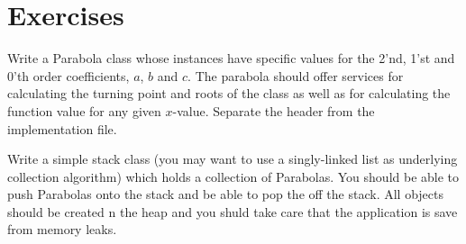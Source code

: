 \section{Exercises}

\begin{exercises}
  \item Write a Parabola class whose instances have specific values for 
        the 2'nd, 1'st and 0'th order coefficients, $a$, $b$ and $c$.
        The parabola should offer services for calculating the turning
        point and roots of the class as well as for calculating the function
        value for any given $x$-value. Separate the header from the
        implementation file.
        
  \item Write a simple stack class (you may want to use a singly-linked
        list as underlying collection algorithm) which holds a collection of
        Parabolas. You should be able to push Parabolas onto the stack
        and be able to pop the off the stack. All objects should be
        created n the heap and you shuld take care that the application
        is save from memory leaks.
\end{exercises}  
